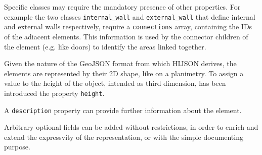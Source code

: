 Specific classes may require the mandatory presence of other properties. For
eexample the two classes {\tt internal_wall} and {\tt external_wall} that
define internal and external walls respectively, require a {\tt connections}
array, containing the IDs of the adiacent elements. This information is used
by the connector children of the element (e.g. like doors) to identify the
areas linked together.

Given the nature of the GeoJSON format from which HIJSON
derives, the elements are represented by their 2D shape, like on a
planimetry. To assign a value to the height of the object, intended as
third dimension, has been introduced the property {\tt height}.

A {\tt description} property can provide further information about
the element.

Arbitrary optional fields can be added without restrictions, in order to
enrich and extend the expressvity of the representation, or with the simple
documenting purpose.
